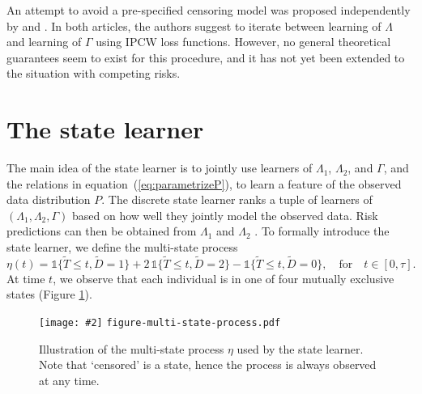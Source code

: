 \documentclass[numsec,webpdf,contemporary,medium,namedate]{oup-authoring-template}%
\theoremstyle{thmstyleone}%
\theoremstyle{thmstyletwo}%
\theoremstyle{thmstylethree}%
\newcommand{\includeFigCond}[2][]{
  \ifx\nofig\undefined %
    \texttt{[image: \#2]} %
  \else %
    \texttt{#2} %
  \fi %
}
\newcommand{\1}{\mathds{1}}
\begin{document}
An attempt to avoid a pre-specified censoring model was proposed
independently by \cite{han2021inverse} and
\cite{westling2021inference}. In both articles, the authors suggest to
iterate between learning of \( \Lambda \) and learning of $\Gamma$
using IPCW loss functions. However, no general theoretical guarantees
seem to exist for this procedure, and it has not yet been extended to
the situation with competing risks.

\section{The state learner}
\label{sec:super-learner-simple}

The main idea of the state learner is to jointly use learners of
\( \Lambda_1 \), \( \Lambda_2 \), and \( \Gamma \), and the relations in
equation~(\ref{eq:parametrizeP}), to learn a feature of the observed data
distribution \( P \). The discrete state learner ranks a tuple of learners of
\( (\Lambda_1, \Lambda_2, \Gamma) \) based on how well they jointly model the
observed
data.
Risk predictions can then be obtained from
\( \Lambda_1 \) and $\Lambda_2$ \citep{benichou1990estimates, ozenne2017riskregression}. To formally
introduce the state learner, we define the multi-state process
\begin{equation*}
  \eta(t) = \1\{\tilde{T} \leq t, \tilde D=1\} + 2\,\1\{\tilde{T} \leq t, \tilde
  D=2\} - \1\{\tilde{T} \leq t, \tilde D=0\},
  \quad \text{for} \quad t \in [0, \tau].
\end{equation*}
At time \(t\), we observe that each individual is in one of four mutually
exclusive states (Figure \ref{fig:multi-state-process}).

\begin{figure}[h]
  \centering %
  \includeFigCond[width=.5\textwidth]{figure-multi-state-process.pdf}
  \caption{Illustration of the multi-state process \(\eta\) used by
    the state learner. Note that `censored' is a state, hence the
    process is always observed at any time.}
  \label{fig:multi-state-process}
\end{figure}
\end{document}
